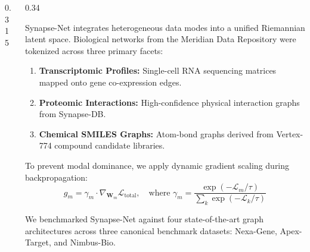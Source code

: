 \documentclass[final]{beamer}
\begin{document}
\begin{frame}[t]
\begin{columns}[t]
\begin{column}{0.315\textwidth}
  \end{column}

  \begin{column}{0.34\textwidth}

    \begin{tcolorbox}[posterblock, title=\faFile\ Multi-Modal Integration Strategy]
      \large
      Synapse-Net integrates heterogeneous data modes into a unified Riemannian latent space. Biological networks from the Meridian Data Repository were tokenized across three primary facets:
      \begin{enumerate}
        \item \textbf{Transcriptomic Profiles:} Single-cell RNA sequencing matrices mapped onto gene co-expression edges.
        \item \textbf{Proteomic Interactions:} High-confidence physical interaction graphs from Synapse-DB.
        \item \textbf{Chemical SMILES Graphs:} Atom-bond graphs derived from Vertex-774 compound candidate libraries.
      \end{enumerate}

      \vspace{6pt}
      To prevent modal dominance, we apply dynamic gradient scaling during backpropagation:
      \begin{equation*}
        g_m = \gamma_m \cdot \nabla_{\mathbf{W}_m} \mathcal{L}_{\text{total}}, \quad \text{where } \gamma_m = \frac{\exp(-\mathcal{L}_m / \tau)}{\sum_k \exp(-\mathcal{L}_k / \tau)}
      \end{equation*}
    \end{tcolorbox}

    \vspace{14pt}

    \begin{tcolorbox}[posterblock, title=\faFile\ Quantitative Performance Evaluation]
      \large
      We benchmarked Synapse-Net against four state-of-the-art graph architectures across three canonical benchmark datasets: Nexa-Gene, Apex-Target, and Nimbus-Bio.


\end{tcolorbox}
\end{column}
\end{columns}
\end{frame}
\end{document}
